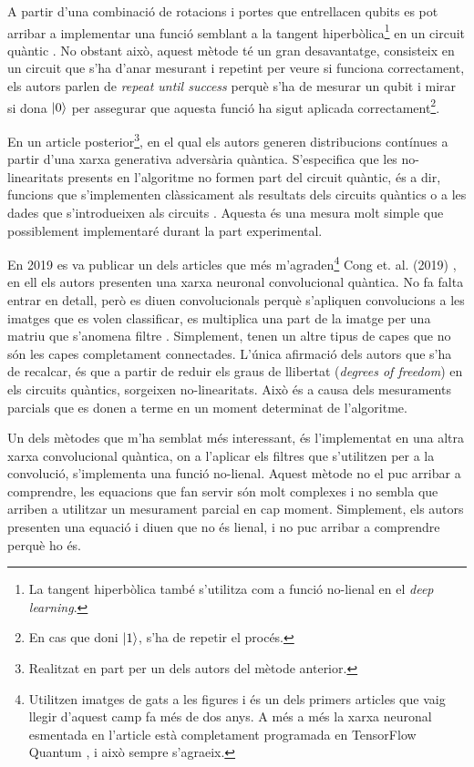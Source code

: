 A partir d'una combinació de rotacions i portes que entrellacen qubits es pot arribar a implementar una funció semblant a la tangent hiperbòlica\footnote{La tangent hiperbòlica també s'utilitza com a funció no-lienal en el \textit{deep learning}.} en un circuit quàntic \cite{cao2017quantum}. No obstant això, aquest mètode té un gran desavantatge, consisteix en un circuit que s'ha d'anar mesurant i repetint per veure si funciona correctament, els autors parlen de \textit{repeat until success} perquè s'ha de mesurar un qubit i mirar si dona $\ket{0}$ per assegurar que aquesta funció ha sigut aplicada correctament\footnote{En cas que doni $\ket{1}$, s'ha de repetir el procés.}.

En un article posterior\footnote{Realitzat en part per un dels autors del mètode anterior.}, en el qual els autors generen distribucions contínues a partir d'una xarxa generativa adversària quàntica.
S'especifica que les no-linearitats presents en l'algoritme no formen part del circuit quàntic, és a dir, funcions que s'implementen clàssicament als resultats dels circuits quàntics o a les dades que s'introdueixen als circuits \cite{romero2019variational}. Aquesta és una mesura molt simple que possiblement implementaré durant la part experimental.

En 2019 es va publicar un dels articles que més m'agraden\footnote{Utilitzen imatges de gats a les figures i és un dels primers articles que vaig llegir d'aquest camp fa més de dos anys. A més a més la xarxa neuronal esmentada en l'article està completament programada en TensorFlow Quantum \cite{tfq}, i això sempre s'agraeix. } Cong et. al. (2019) \cite{cong2019convolucional}, en ell els autors presenten una xarxa neuronal convolucional quàntica. No fa falta entrar en detall, però es diuen convolucionals perquè s'apliquen convolucions a les imatges que es volen classificar, es multiplica una part de la imatge per una matriu que s'anomena filtre \cite{CNN}. Simplement, tenen un altre tipus de capes que no són les capes completament connectades. L'única afirmació dels autors que s'ha de recalcar, és que a partir de reduir els graus de llibertat (\textit{degrees of freedom}) en els circuits quàntics, sorgeixen no-linearitats. Això és a causa dels mesuraments parcials que es donen a terme en un moment determinat de l'algoritme.

Un dels mètodes que m'ha semblat més interessant, és l'implementat en una altra xarxa convolucional quàntica, on a l'aplicar els filtres que s'utilitzen per a la convolució, s'implementa una funció no-lienal. Aquest mètode no el puc arribar a comprendre, les equacions que fan servir són molt complexes i no sembla que arriben a utilitzar un mesurament parcial en cap moment. Simplement, els autors presenten una equació i diuen que no és lienal, i no puc arribar a comprendre perquè ho és.

